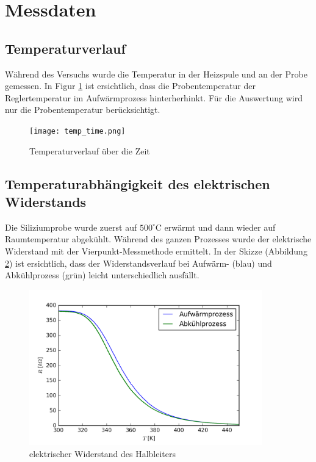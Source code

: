 \documentclass[a4paper]{scrartcl}
\begin{document}
\newpage

\section{Messdaten}

\subsection{Temperaturverlauf}
Während des Versuchs wurde die Temperatur in der Heizspule und an der Probe gemessen. In Figur \ref{temp_time} ist ersichtlich, dass die Probentemperatur der Reglertemperatur im Aufwärmprozess hinterherhinkt. Für die Auswertung wird nur die Probentemperatur berücksichtigt.
%
\begin{figure}[htbp]
\centering
\texttt{[image: temp\_time.png]}
\caption{Temperaturverlauf über die Zeit}
\label{temp_time}
\end{figure}
%

\subsection{Temperaturabhängigkeit des elektrischen Widerstands}
Die Siliziumprobe wurde zuerst auf $500^{\circ}$C erwärmt und dann wieder auf Raumtemperatur abgekühlt. Während des ganzen Prozesses wurde der elektrische Widerstand mit der Vierpunkt-Messmethode ermittelt. In der Skizze (Abbildung \ref{res_temp}) ist ersichtlich, dass der Widerstandsverlauf bei Aufwärm- (blau) und Abkühlprozess (grün) leicht unterschiedlich ausfällt.
%
\begin{figure}[htbp]
\centering
\includegraphics[width=0.9\textwidth]{res_temp.png}
\caption{elektrischer Widerstand des Halbleiters}
\label{res_temp}
\end{figure}
%
\end{document}
